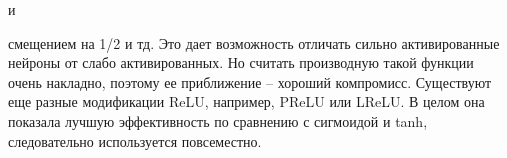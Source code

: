 %
%
%
%
%
%
%
и



смещением на 1/2 и тд. Это дает возможность отличать сильно активированные нейроны от слабо активированных. Но
считать производную такой функции очень накладно, поэтому ее приближение -- хороший компромисс. Существуют еще
разные модификации ReLU, например, PReLU или LReLU. В целом она показала лучшую эффективность по сравнению с
сигмоидой и tanh, следовательно используется повсеместно.
%










































